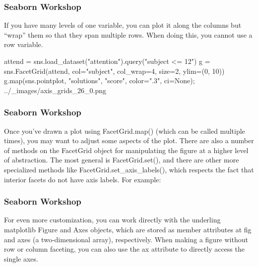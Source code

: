 \begin{frame}[fragile]
\frametitle{Seaborn Workshop}
\large
If you have many levels of one variable, you can plot it along the columns but “wrap” them so that they span multiple rows. When doing this, you cannot use a row variable.

attend = sns.load_dataset("attention").query("subject <= 12")
g = sns.FacetGrid(attend, col="subject", col_wrap=4, size=2, ylim=(0, 10))
g.map(sns.pointplot, "solutions", "score", color=".3", ci=None);
../_images/axis_grids_26_0.png

\end{frame}
\begin{frame}[fragile]
\frametitle{Seaborn Workshop}
\large

Once you’ve drawn a plot using FacetGrid.map() (which can be called multiple times), you may want to adjust some aspects of the plot. There are also a number of methods on the FacetGrid object for manipulating the figure at a higher level of abstraction. The most general is FacetGrid.set(), and there are other more specialized methods like FacetGrid.set_axis_labels(), which respects the fact that interior facets do not have axis labels. For example:
\end{frame}
\begin{frame}[fragile]
\frametitle{Seaborn Workshop}
\large

For even more customization, you can work directly with the underling matplotlib Figure and Axes objects, which are stored as member attributes at fig and axes (a two-dimensional array), respectively. When making a figure without row or column faceting, you can also use the ax attribute to directly access the single axes.

\end{frame}
